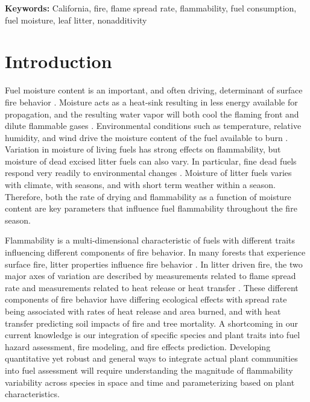 \documentclass[letterpaper,12pt]{article}
\begin{document}
\noindent \textbf{Keywords:} California, fire, flame spread rate, flammability,
fuel consumption, fuel moisture, leaf litter, nonadditivity

\newpage

\section*{Introduction}

Fuel moisture content is an important, and often driving, determinant of
surface fire behavior \citep{Rothermel-1972}. Moisture acts as a heat-sink
resulting in less energy available for propagation, and the resulting water
vapor will both cool the flaming front and dilute flammable gases
\citep{Albini-1976, Shafizadeh-1977}. Environmental conditions such as
temperature, relative humidity, and wind drive the moisture content of the fuel
available to burn \citep{Kreye+Varner+etal-2018}. Variation in moisture of
living fuels has strong effects on flammability, but moisture of dead excised
litter fuels can also vary. In particular, fine dead fuels respond very readily
to environmental changes \citep{Nelson-2001}. Moisture of litter fuels varies
with climate, with seasons, and with short term weather within a season.
Therefore, both the rate of drying and flammability as a function of moisture
content are key parameters that influence fuel flammability throughout the fire
season.

Flammability is a multi-dimensional characteristic of fuels
\citep{Schwilk-2015, Pausas+Keeley+etal-2017} with different traits influencing
different components of fire behavior. In many forests that experience surface
fire, litter properties influence fire behavior
\citep{Ganteaume+Marielle+etal-2011, Schwilk+Caprio-2011,
  Varner+Kane+etal-2015}. In litter driven fire, the two major axes of
variation are described by measurements related to flame spread rate and
measurements related to heat release or heat transfer
\citep{Magalhaes+Schwilk-2012, Prior+Murphy+etal-2018}. These different
components of fire behavior have differing ecological effects with spread rate
being associated with rates of heat release and area burned, and with heat
transfer predicting soil impacts of fire and tree mortality. A shortcoming in
our current knowledge is our integration of specific species and plant traits
into fuel hazard assessment, fire modeling, and fire effects prediction.
Developing quantitative yet robust and general ways to integrate actual plant
communities into fuel assessment will require understanding the magnitude of
flammability variability across species in space and time and parameterizing
based on plant characteristics.
\end{document}
